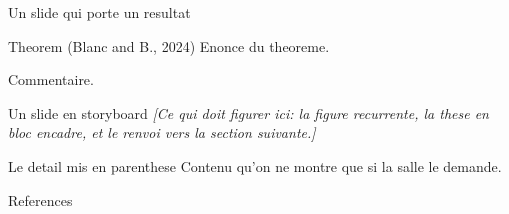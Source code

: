 \documentclass[compress,dvipsnames]{beamer}
\newcommand\RETOUR[1]{%
  \hypertarget{detail#1}{}%
  \gdef\FINPAREN{{\raggedleft\hyperlink{back#1}{\beamerreturnbutton{back}}\par}}}
\newcommand\FINPAREN{}
\newenvironment{THEOREME}[2]
  {\begin{alertblock}{Theorem (#1) \cite{#2}}}{\end{alertblock}}
\newcommand\CONTENU[1]{{\footnotesize\itshape\color{ocgris}[#1]}}
\begin{document}
\begin{myslide}{Un slide qui porte un resultat}
\begin{THEOREME}{Blanc and B., 2024}{CSL24,Icalp2024}
Enonce du theoreme.
\end{THEOREME}

\pause
\medskip
Commentaire.
\end{myslide}

\begin{myslide}{Un slide en storyboard}
\CONTENU{Ce qui doit figurer ici: la figure recurrente, la these en bloc
encadre, et le renvoi vers la section suivante.}
\end{myslide}


\appendix

\begin{myslide}{Le detail mis en parenthese}\RETOUR{Ex}
Contenu qu'on ne montre que si la salle le demande.
\FINPAREN
\end{myslide}

\begin{frame}{References}


\end{frame}
\end{document}
